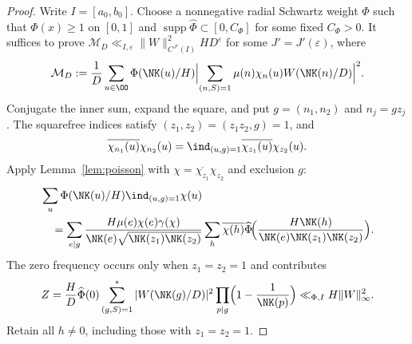 \begin{proof}
Write $I=[a_0,b_0]$. Choose a nonnegative radial Schwartz weight
$\Phi$ such that $\Phi(x)\ge1$ on $[0,1]$ and
$\operatorname{supp}\widehat\Phi\subset[0,C_\Phi]$ for some fixed $C_\Phi>0$.
It suffices to prove
$\mathcal M_D\ll_{I,\varepsilon}
\|W\|_{C^{J'}(I)}^2HD^\varepsilon$ for some $J'=J'(\varepsilon)$, where
\begin{equation}\label{eq:expanded-ms}
 \mathcal M_D:=\frac1D\sum_{u\in\OO}\Phi(\NK(u)/H)
 \Bigl|\sum_{(n,S)=1}\mu(n)\chi_n(u)W(\NK(n)/D)\Bigr|^2.
\end{equation}
Conjugate the inner sum, expand the square, and put
$g=(n_1,n_2)$ and $n_j=gz_j$. The squarefree indices satisfy
$(z_1,z_2)=(z_1z_2,g)=1$, and
\[
 \overline{\chi_{n_1}(u)}\chi_{n_2}(u)
 =\ind_{(u,g)=1}\overline{\chi_{z_1}(u)}\chi_{z_2}(u).
\]
Apply Lemma~\ref{lem:poisson} with
$\chi=\overline{\chi_{z_1}}\chi_{z_2}$ and exclusion $g$:
\begin{equation}\label{eq:initial-poisson-rows}
 \begin{aligned}
 &\sum_u\Phi(\NK(u)/H)\ind_{(u,g)=1}\chi(u)\\
 &\quad=\sum_{e\mid g}
 \frac{H\mu(e)\chi(e)\gamma(\chi)}
      {\NK(e)\sqrt{\NK(z_1)\NK(z_2)}}
 \sum_h\overline{\chi(h)}
 \widehat\Phi\!\Bigl(\frac{H\NK(h)}{\NK(e)\NK(z_1)\NK(z_2)}\Bigr).
 \end{aligned}
\end{equation}
The zero frequency occurs only when $z_1=z_2=1$ and contributes
\[
 Z=\frac HD\widehat\Phi(0)
 \sum_{(g,S)=1}^*|W(\NK(g)/D)|^2
       \prod_{p\mid g}\Bigl(1-\frac1{\NK(p)}\Bigr)
 \ll_{\Phi,I}H\|W\|_\infty^2.
\]
Retain all $h\ne0$, including those with $z_1=z_2=1$.


\end{proof}
